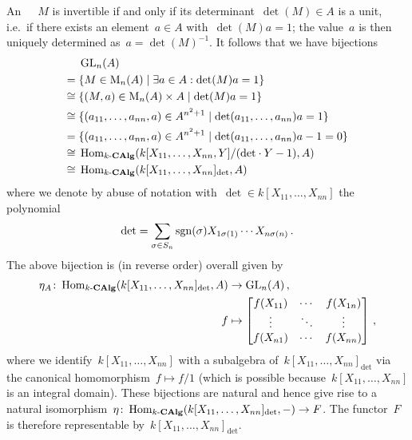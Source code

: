 An~~~$M$ is invertible if and only if its determinant~$\det(M) \in A$ is a unit, i.e.\ if there exists an element~$a \in A$ with~$\det(M) a = 1$;
the value~$a$ is then uniquely determined as~$a = \det(M)^{-1}$.
It follows that we have bijections
\begin{align*}
       {}&  \GL_n(A)  \\
      ={}&  \{
              M \in \mat{n}{A}
              \suchthat
            \exists a \in A : \det(M) a  = 1
            \} \\
  \cong{}&  \{
              (M,a) \in \mat{n}{A} \times A
            \suchthat
              \det(M) a = 1
            \} \\
  \cong{}&  \{
              (a_{11}, \dotsc, a_{nn}, a) \in A^{n^2 + 1}
            \suchthat
              \det(a_{11}, \dotsc, a_{nn}) a = 1
            \}  \\
      ={}&  \{
              (a_{11}, \dotsc, a_{nn}, a) \in A^{n^2 + 1}
            \suchthat
              \det(a_{11}, \dotsc, a_{nn}) a - 1 = 0
            \}  \\
  \cong{}&  \Hom_{\kCommAlg}(k[X_{11}, \dotsc, X_{nn}, Y]/({\det} \cdot Y - 1), A)  \\
  \cong{}&  \Hom_{\kCommAlg}(k[X_{11}, \dotsc, X_{nn}]_{\det}, A)
\end{align*}
where we denote by abuse of notation with~$\det \in k[X_{11}, \dotsc, X_{nn}]$ the polynomial
\[
    \det
  = \sum_{\sigma \in S_n} \operatorname{sgn}(\sigma) X_{1 \sigma(1)} \dotsm X_{n \sigma(n)} \,.
\]
The above bijection is (in reverse order) overall given by
\begin{align*}
            \eta_A
   \colon   \operatorname{Hom}_{\text{$k$-$\mathbf{CAlg}$}}(k[X_{11}, \dotsc, X_{nn}]_{\det}, A)
  &\to      \operatorname{GL}_n(A) \,,
  \\
            f
  &\mapsto  \begin{bmatrix}
              f(X_{11}) & \cdots  & f(X_{1n}) \\
              \vdots    & \ddots  & \vdots    \\
              f(X_{n1}) & \cdots  & f(X_{nn})
            \end{bmatrix} \,,
\end{align*}
where we identify~$k[X_{11}, \dotsc, X_{nn}]$ with a subalgebra of~$k[X_{11}, \dotsc, X_{nn}]_{\det}$ via the canonical homomorphism~$f \mapsto f/1$ (which is possible because~$k[X_{11}, \dotsc, X_{nn}]$ is an integral domain).
These bijections are natural and hence give rise to a natural isomorphism~$\eta \colon \operatorname{Hom}_{\text{$k$-$\mathbf{CAlg}$}}(k[X_{11}, \dotsc, X_{nn}]_{\det}, -) \to F$.
The functor~$F$ is therefore representable by~$k[X_{11}, \dotsc, X_{nn}]_{\det}$.




